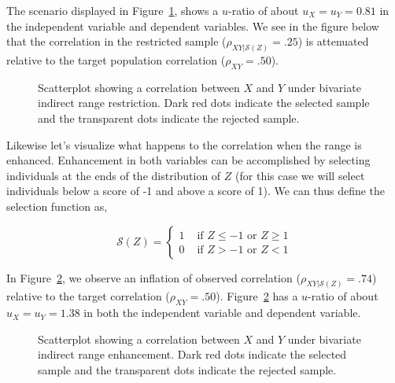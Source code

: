 \documentclass[
  letterpaper,
  DIV=11,
  numbers=noendperiod]{scrreprt}
\begin{document}
The scenario displayed in Figure~\ref{fig-bvirr}, shows a \(u\)-ratio of
about \(u_X=u_Y=0.81\) in the independent variable and dependent
variables. We see in the figure below that the correlation in the
restricted sample (\(\rho_{XY|\mathcal{S}(Z)}=.25\)) is attenuated
relative to the target population correlation (\(\rho_{XY}=.50\)).

\begin{figure}[H]


\caption{\label{fig-bvirr}Scatterplot showing a correlation between
\(X\) and \(Y\) under bivariate indirect range restriction. Dark red
dots indicate the selected sample and the transparent dots indicate the
rejected sample.}

\end{figure}%

Likewise let's visualize what happens to the correlation when the range
is enhanced. Enhancement in both variables can be accomplished by
selecting individuals at the ends of the distribution of \(Z\) (for this
case we will select individuals below a score of -1 and above a score of
1). We can thus define the selection function as,

\[
\mathcal{S}(Z)=\begin{cases} 1 &\text{ if } Z \leq-1 \text{ or } Z \geq 1  \\  0 &\text{ if } Z > -1  \text{ or } Z < 1   \end{cases}
\]

In Figure~\ref{fig-bvire}, we observe an inflation of observed
correlation (\(\rho_{XY|\mathcal{S}(Z)}=.74\)) relative to the target
correlation (\(\rho_{XY}=.50\)). Figure~\ref{fig-bvire} has a
\(u\)-ratio of about \(u_X=u_Y=1.38\) in both the independent variable
and dependent variable.

\begin{figure}[H]


\caption{\label{fig-bvire}Scatterplot showing a correlation between
\(X\) and \(Y\) under bivariate indirect range enhancement. Dark red
dots indicate the selected sample and the transparent dots indicate the
rejected sample.}

\end{figure}%
\end{document}
